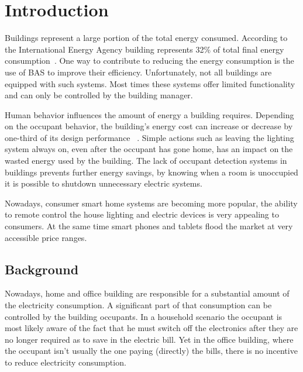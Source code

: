 \chapter{Introduction}
\label{chapter:introduction}
Buildings represent a large portion of the total energy consumed. According to the International Energy Agency building represents 32\% of total final energy consumption~\cite{iea}. One way to contribute to reducing the energy consumption is the use of \ac{BAS} to improve their efficiency. Unfortunately, not all buildings are equipped with such systems. Most times these systems offer limited functionality and can only be controlled by the building manager.

Human behavior influences the amount of energy a building requires. Depending on the occupant behavior, the building's energy cost can increase or decrease by one-third of its design performance ~\cite{ocupancy2}. Simple actions such as leaving the lighting system always on, even after the occupant has gone home, has an impact on the wasted energy used by the building. The lack of occupant detection systems in buildings prevents further energy savings, by knowing when a room is unoccupied it is possible to shutdown unnecessary electric systems.

Nowadays, consumer smart home systems are becoming more popular, the ability to remote control the house lighting and electric devices is very appealing to consumers. At the same time smart phones and tablets flood the market at very accessible price ranges. 

\section{Background}
\label{section:background}
Nowadays, home and office building are responsible for a substantial amount of the electricity consumption. A significant part of that consumption can be controlled by the building occupants. In a household scenario the occupant is most likely aware of the fact that he must switch off the electronics after they are no longer required as to save in the electric bill. Yet in the office building, where the occupant isn't usually the one paying (directly) the bills, there is no incentive to reduce electricity consumption.


